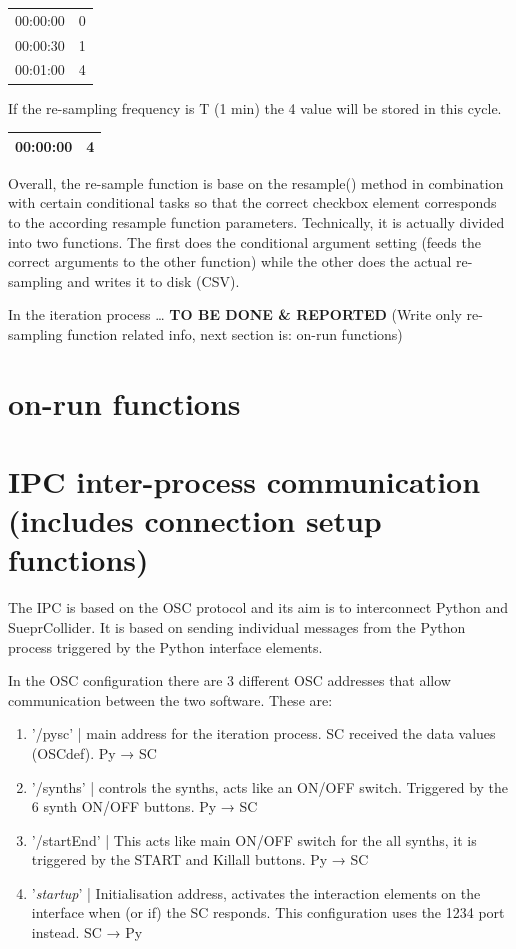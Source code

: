 \documentclass[11pt]{article}
\begin{document}
\begin{center}
\begin{tabular}{rr}
\hline
00:00:00 & 0\\
00:00:30 & 1\\
00:01:00 & 4\\
\hline
\end{tabular}
\end{center}

If the re-sampling frequency is T (1 min) the 4 value will be stored in this cycle.

\begin{center}
\begin{tabular}{rr}
\hline
00:00:00 & 4\\
\hline
\end{tabular}
\end{center}

Overall, the re-sample function is base on the resample() method in combination with certain conditional tasks so that the correct checkbox element corresponds to the according resample function parameters.  Technically, it is actually divided into two functions.  The first does the conditional argument setting (feeds the correct arguments to the other function) while the other does the actual re-sampling and writes it to disk (CSV).

In the iteration process \ldots{} \textbf{TO BE DONE \& REPORTED}  (Write only re-sampling function related info, next section is: on-run functions)

\section{on-run functions}
\label{sec:orgf51a496}
\section{IPC inter-process communication (includes connection setup functions)}
\label{sec:org02341a6}
The IPC is based on the OSC protocol and its aim is to interconnect Python and SueprCollider.  It is based on sending individual messages from the Python process triggered by the Python interface elements.

In the OSC configuration there are 3 different OSC addresses that allow communication between the two software.  These are:
\begin{enumerate}
\item '/pysc' | main address for the iteration process.  SC received the data values (OSCdef).  Py → SC
\item '/synths' | controls the synths, acts like an ON/OFF switch.  Triggered by the 6 synth ON/OFF buttons. Py → SC
\item '/startEnd' | This acts like main ON/OFF switch for the all synths, it is triggered by the START and Killall buttons. Py → SC
\item '\emph{startup}' | Initialisation address, activates the interaction elements on the interface when (or if) the SC responds.  This configuration uses the 1234 port instead. SC → Py
\end{enumerate}
\end{document}
